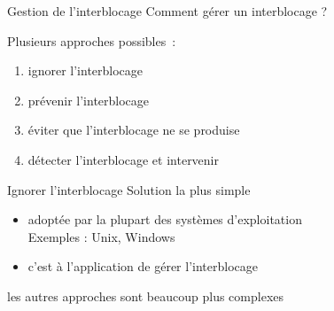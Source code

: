 

\begin {frame} {Gestion de l'interblocage}
    Comment gérer un interblocage ?

    \vspace* {3mm}

    Plusieurs approches possibles~:
    \begin {enumerate}
	\item ignorer l'interblocage
	\item prévenir l'interblocage
	\item éviter que l'interblocage ne se produise
	\item détecter l'interblocage et intervenir
    \end {enumerate}
\end {frame}

\begin {frame} {Ignorer l'interblocage}
    Solution la plus simple

    \begin {itemize}
	\item adoptée par la plupart des systèmes d'exploitation \\
	    Exemples : Unix, Windows

	\item c'est à l'application de gérer l'interblocage
    \end {itemize}

    \implique les autres approches sont beaucoup plus complexes

\end {frame}

